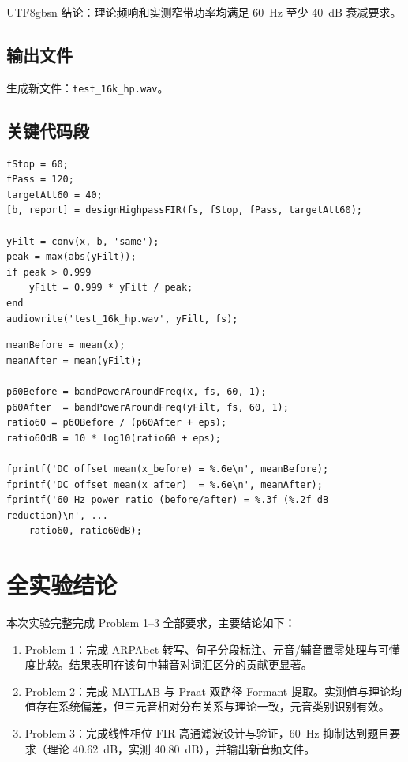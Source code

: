 \documentclass[12pt,a4paper]{article}
\begin{document}
\begin{CJK*}{UTF8}{gbsn}
结论：理论频响和实测窄带功率均满足 \SI{60}{Hz} 至少 \SI{40}{dB} 衰减要求。

\subsection{输出文件}
生成新文件：\texttt{test\_16k\_hp.wav}。

\subsection{关键代码段}
\begin{lstlisting}[caption={Problem 3 FIR 高通滤波设计与滤波执行}]
fStop = 60;
fPass = 120;
targetAtt60 = 40;
[b, report] = designHighpassFIR(fs, fStop, fPass, targetAtt60);

yFilt = conv(x, b, 'same');
peak = max(abs(yFilt));
if peak > 0.999
    yFilt = 0.999 * yFilt / peak;
end
audiowrite('test_16k_hp.wav', yFilt, fs);
\end{lstlisting}

\begin{lstlisting}[caption={Problem 3 DC 偏置与 60Hz 功率比验证}]
meanBefore = mean(x);
meanAfter = mean(yFilt);

p60Before = bandPowerAroundFreq(x, fs, 60, 1);
p60After  = bandPowerAroundFreq(yFilt, fs, 60, 1);
ratio60 = p60Before / (p60After + eps);
ratio60dB = 10 * log10(ratio60 + eps);

fprintf('DC offset mean(x_before) = %.6e\n', meanBefore);
fprintf('DC offset mean(x_after)  = %.6e\n', meanAfter);
fprintf('60 Hz power ratio (before/after) = %.3f (%.2f dB reduction)\n', ...
    ratio60, ratio60dB);
\end{lstlisting}

\section{全实验结论}
本次实验完整完成 Problem 1--3 全部要求，主要结论如下：
\begin{enumerate}
    \item Problem 1：完成 ARPAbet 转写、句子分段标注、元音/辅音置零处理与可懂度比较。结果表明在该句中辅音对词汇区分的贡献更显著。
    \item Problem 2：完成 MATLAB 与 Praat 双路径 Formant 提取。实测值与理论均值存在系统偏差，但三元音相对分布关系与理论一致，元音类别识别有效。
    \item Problem 3：完成线性相位 FIR 高通滤波设计与验证，\SI{60}{Hz} 抑制达到题目要求（理论 \SI{40.62}{dB}，实测 \SI{40.80}{dB}），并输出新音频文件。
\end{enumerate}


\ifPDFTeX\end{CJK*}\fi
\end{document}

